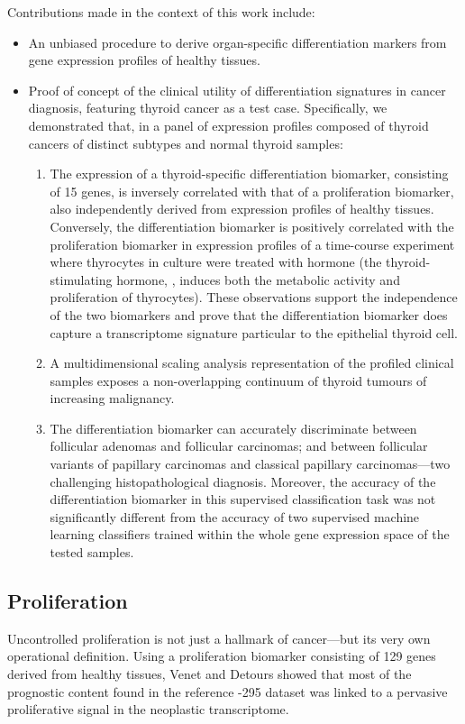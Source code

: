 Contributions made in the context of this work include:
\begin{itemize}{}{}
\item An unbiased procedure to derive \mbox{organ-specific} differentiation
  markers from gene expression profiles of healthy tissues.
\item Proof of concept of the clinical utility of differentiation signatures in
  cancer diagnosis, featuring thyroid cancer as a test case.  Specifically, we
  demonstrated that, in a panel of expression profiles composed of thyroid
  cancers of distinct subtypes and normal thyroid samples:
  \begin{enumerate}
  \item The expression of a \mbox{thyroid-specific} differentiation biomarker,
    consisting of 15 genes, is inversely correlated with that of a proliferation
    biomarker, also independently derived from expression profiles of healthy
    tissues.  Conversely, the differentiation biomarker is positively correlated
    with the proliferation biomarker in expression profiles of a
    \mbox{time-course} experiment where thyrocytes in culture were treated with
     hormone (the \mbox{thyroid-stimulating} hormone,
    , induces both the metabolic activity and proliferation of
    thyrocytes).  These observations support the independence of the two
    biomarkers and prove that the differentiation biomarker does capture a
    transcriptome signature particular to the epithelial thyroid cell.
  \item A multidimensional scaling analysis representation of the profiled
    clinical samples exposes a non-overlapping continuum of thyroid tumours of
    increasing malignancy.
  \item The differentiation biomarker can accurately discriminate between
    follicular adenomas and follicular carcinomas; and between follicular
    variants of papillary carcinomas and classical papillary carcinomas---two
    challenging histopathological diagnosis.  Moreover, the accuracy of the
    differentiation biomarker in this supervised classification task was not
    significantly different from the accuracy of two supervised machine learning
    classifiers trained within the whole gene expression space of the tested
    samples.
  \end{enumerate}
\end{itemize}

\subsection{Proliferation}
Uncontrolled proliferation is not just a hallmark of
cancer\cite{hanahan_hallmarks_2011}---but its very own operational definition.
Using a proliferation biomarker consisting of 129 genes derived from healthy
tissues, Venet and Detours\cite{venet_most_2011} showed that most of the
prognostic content found in the reference -295 dataset was
linked to a pervasive proliferative signal in the neoplastic transcriptome.

